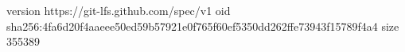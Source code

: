 version https://git-lfs.github.com/spec/v1
oid sha256:4fa6d20f4aaeee50ed59b57921e0f765f60ef5350dd262ffe73943f15789f4a4
size 355389
